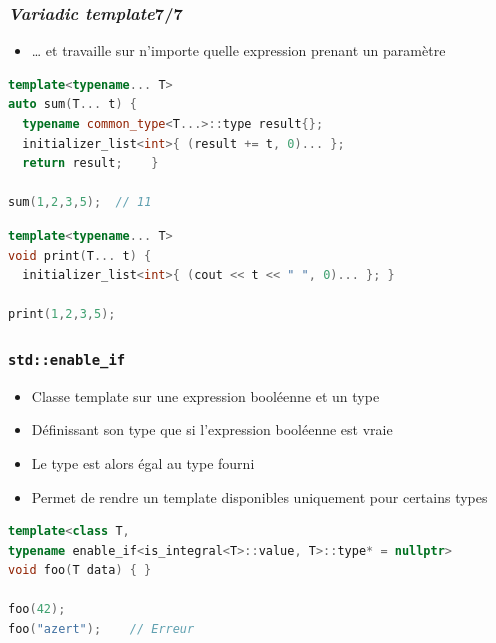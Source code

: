\documentclass[C++.tex]{subfiles}
\begin{document}
\begin{frame}[fragile]
	\frametitle{\textit{Variadic template}\titlehfill{}7/7}
	\begin{itemize}
		\item \ldots{} et travaille sur n'importe quelle expression prenant un paramètre

	\end{itemize}

	\begin{lstlisting}[language=C++]
template<typename... T>
auto sum(T... t) {
  typename common_type<T...>::type result{};
  initializer_list<int>{ (result += t, 0)... };
  return result; 	}

sum(1,2,3,5);  // 11\end{lstlisting}

	\begin{lstlisting}[language=C++]
template<typename... T>
void print(T... t) {
  initializer_list<int>{ (cout << t << " ", 0)... }; }

print(1,2,3,5);\end{lstlisting}
\end{frame}

\begin{frame}[fragile]
	\frametitle{\lstinline|std::enable_if|}
	\begin{itemize}
		\item Classe template sur une expression booléenne et un type
		\item Définissant son type que si l'expression booléenne est vraie
		\item Le type est alors égal au type fourni
		\item Permet de rendre un template disponibles uniquement pour certains types
	\end{itemize}

	\begin{lstlisting}[language=C++]
template<class T, 
typename enable_if<is_integral<T>::value, T>::type* = nullptr>
void foo(T data) { }

foo(42);
foo("azert");    // Erreur\end{lstlisting}
\end{frame}
\end{document}
